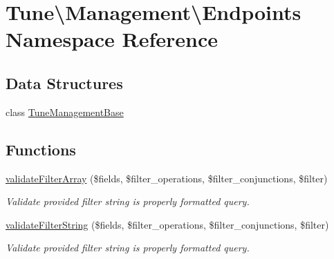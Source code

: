 \hypertarget{namespaceTune_1_1Management_1_1Endpoints}{\section{Tune\textbackslash{}Management\textbackslash{}Endpoints Namespace Reference}
\label{namespaceTune_1_1Management_1_1Endpoints}
}
\subsection*{Data Structures}
\begin{DoxyCompactItemize}
\item 
class \hyperlink{classTune_1_1Management_1_1Endpoints_1_1TuneManagementBase}{Tune\-Management\-Base}
\end{DoxyCompactItemize}
\subsection*{Functions}
\begin{DoxyCompactItemize}
\item 
\hyperlink{namespaceTune_1_1Management_1_1Endpoints_ae2d0d6742ce18cb5d94c1e0fb5ebdabe}{validate\-Filter\-Array} (\$fields, \$filter\-\_\-operations, \$filter\-\_\-conjunctions, \$filter)
\begin{DoxyCompactList}\small\item\em Validate provided filter string is properly formatted query. \end{DoxyCompactList}\item 
\hyperlink{namespaceTune_1_1Management_1_1Endpoints_a8a3f8f7bc986da92a05b19f9ca804e2d}{validate\-Filter\-String} (\$fields, \$filter\-\_\-operations, \$filter\-\_\-conjunctions, \$filter)
\begin{DoxyCompactList}\small\item\em Validate provided filter string is properly formatted query. \end{DoxyCompactList}\end{DoxyCompactItemize}


